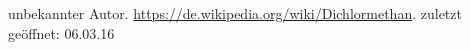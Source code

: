 \begin{thebibliography}{99}
 unbekannter Autor. \url{https://de.wikipedia.org/wiki/Dichlormethan}. zuletzt geöffnet: 06.03.16
\end{thebibliography}
